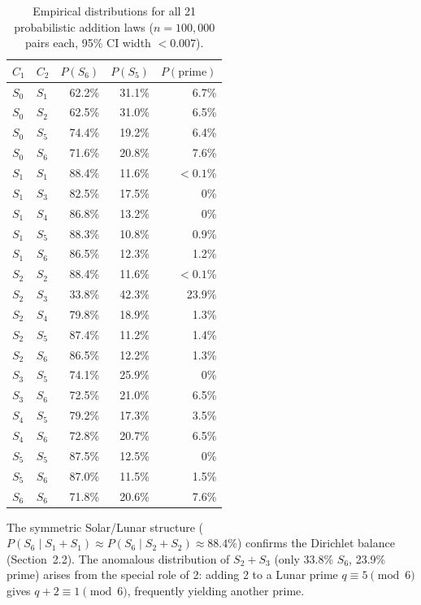 \documentclass[10pt,twocolumn]{article}
\begin{document}
\begin{table}[htbp]
\centering
\caption{Empirical distributions for all 21 probabilistic addition laws
         ($n=100{,}000$ pairs each, 95\% CI width ${<}0.007$).}\label{tab:prob-add}
\small
\setlength{\tabcolsep}{5pt}
\begin{tabular}{@{}llrrr@{}}
\toprule
$C_1$ & $C_2$ & $P(S_6)$ & $P(S_5)$ & $P(\text{prime})$ \\
\midrule
$S_0$ & $S_1$ & 62.2\% & 31.1\% & 6.7\% \\
$S_0$ & $S_2$ & 62.5\% & 31.0\% & 6.5\% \\
$S_0$ & $S_5$ & 74.4\% & 19.2\% & 6.4\% \\
$S_0$ & $S_6$ & 71.6\% & 20.8\% & 7.6\% \\
$S_1$ & $S_1$ & 88.4\% & 11.6\% & ${<}0.1$\% \\
$S_1$ & $S_3$ & 82.5\% & 17.5\% & 0\% \\
$S_1$ & $S_4$ & 86.8\% & 13.2\% & 0\% \\
$S_1$ & $S_5$ & 88.3\% & 10.8\% & 0.9\% \\
$S_1$ & $S_6$ & 86.5\% & 12.3\% & 1.2\% \\
$S_2$ & $S_2$ & 88.4\% & 11.6\% & ${<}0.1$\% \\
$S_2$ & $S_3$ & 33.8\% & 42.3\% & 23.9\% \\
$S_2$ & $S_4$ & 79.8\% & 18.9\% & 1.3\% \\
$S_2$ & $S_5$ & 87.4\% & 11.2\% & 1.4\% \\
$S_2$ & $S_6$ & 86.5\% & 12.2\% & 1.3\% \\
$S_3$ & $S_5$ & 74.1\% & 25.9\% & 0\% \\
$S_3$ & $S_6$ & 72.5\% & 21.0\% & 6.5\% \\
$S_4$ & $S_5$ & 79.2\% & 17.3\% & 3.5\% \\
$S_4$ & $S_6$ & 72.8\% & 20.7\% & 6.5\% \\
$S_5$ & $S_5$ & 87.5\% & 12.5\% & 0\% \\
$S_5$ & $S_6$ & 87.0\% & 11.5\% & 1.5\% \\
$S_6$ & $S_6$ & 71.8\% & 20.6\% & 7.6\% \\
\bottomrule
\end{tabular}
\end{table}

The symmetric Solar/Lunar structure
($P(S_6 \mid S_1{+}S_1) \approx P(S_6 \mid S_2{+}S_2) \approx 88.4\%$)
confirms the Dirichlet balance (Section~2.2).
The anomalous distribution of $S_2 + S_3$ (only 33.8\% $S_6$, 23.9\%
prime) arises from the special role of 2: adding 2 to a Lunar prime
$q \equiv 5 \pmod{6}$ gives $q+2 \equiv 1 \pmod{6}$, frequently yielding
another prime.
\end{document}
